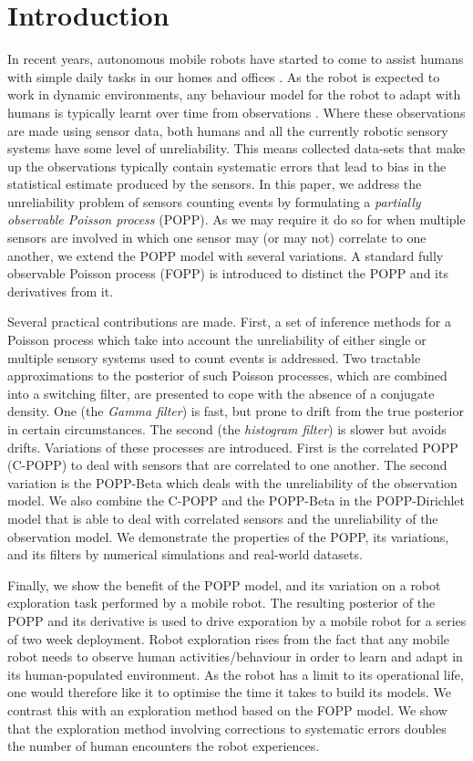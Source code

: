 \section{Introduction}
\label{sec:introduction}

In recent years, autonomous mobile robots have started to come to assist humans with simple daily tasks in our homes and offices \cite{hawes2016strands}. As the robot is expected to work in dynamic environments, any behaviour model for the robot to adapt with humans is typically learnt over time from observations \cite{coppola2016learning}. Where these observations are made using sensor data, both humans and all the currently robotic sensory systems have some level of unreliability. This means collected data-sets that make up the observations typically contain systematic errors that lead to bias in the statistical estimate produced by the sensors. In this paper, we address the unreliability problem of sensors counting events by formulating a \textit{partially observable Poisson process} (POPP). As we may require it do so for when multiple sensors are involved in which one sensor may (or may not) correlate to one another, we extend the POPP model with several variations. A standard fully observable Poisson process (FOPP) is introduced to distinct the POPP and its derivatives from it.

Several practical contributions are made. First, a set of inference methods for a Poisson process which take into account the unreliability of either single or multiple sensory systems used to count events is addressed. Two tractable approximations to the posterior of such Poisson processes, which are combined into a switching filter, are presented to cope with the absence of a conjugate density. One (the \textit{Gamma filter}) is fast, but prone to drift from the true posterior in certain circumstances. The second (the \textit{histogram filter}) is slower but avoids drifts. Variations of these processes are introduced. First is the correlated POPP (C-POPP) to deal with sensors that are correlated to one another. The second variation is the POPP-Beta which deals with the unreliability of the observation model. We also combine the C-POPP and the POPP-Beta in the POPP-Dirichlet model that is able to deal with correlated sensors and the unreliability of the observation model. We demonstrate the properties of the POPP, its variations, and its filters by numerical simulations and real-world datasets.

Finally, we show the benefit of the POPP model, and its variation on a robot exploration task performed by a mobile robot. The resulting posterior of the POPP and its derivative is used to drive exporation by a mobile robot for a series of two week deployment. Robot exploration rises from the fact that any mobile robot needs to observe human activities/behaviour in order to learn and adapt in its human-populated environment. As the robot has a limit to its operational life, one would therefore like it to optimise the time it takes to build its models. We contrast this with an exploration method based on the FOPP model. We show that the exploration method involving corrections to systematic errors doubles the number of human encounters the robot experiences. 

